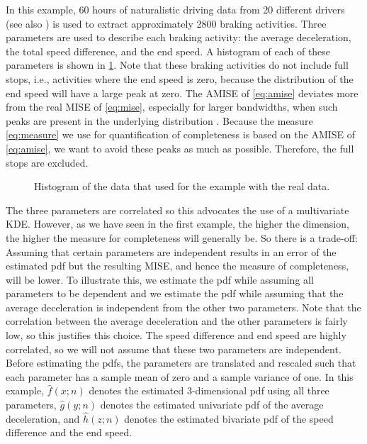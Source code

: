 In this example, 60 hours of naturalistic driving data from 20 different drivers (see also \textcite{deGelder2017assessment}) is used to extract approximately 2800 braking activities. Three parameters are used to describe each braking activity: the average deceleration, the total speed difference, and the end speed. A histogram of each of these parameters is shown in \cref{fig:histogram}. Note that these braking activities do not include full stops, i.e., activities where the end speed is zero, because the distribution of the end speed will have a large peak at zero. The AMISE of \cref{eq:amise} deviates more from the real MISE of \cref{eq:mise}, especially for larger bandwidths, when such peaks are present in the underlying distribution \cite{marron1992exact}. Because the measure \cref{eq:measure} we use for quantification of completeness is based on the AMISE of \cref{eq:amise}, we want to avoid these peaks as much as possible. Therefore, the full stops are excluded.

\setlength\figurewidth{\linewidth}
\setlength{}
\begin{figure}
	\centering
	
	\caption{Histogram of the data that used for the example with the real data.}
	\label{fig:histogram}
\end{figure}

The three parameters are correlated so this advocates the use of a multivariate KDE. However, as we have seen in the first example, the higher the dimension, the higher the measure for completeness will generally be. So there is a trade-off: Assuming that certain parameters are independent results in an error of the estimated pdf but the resulting MISE, and hence the measure of completeness, will be lower. To illustrate this, we estimate the pdf while assuming all parameters to be dependent and we estimate the pdf while assuming that the average deceleration is independent from the other two parameters. Note that the correlation between the average deceleration and the other parameters is fairly low, so this justifies this choice. The speed difference and end speed are highly correlated, so we will not assume that these two parameters are independent. Before estimating the pdfs, the parameters are translated and rescaled such that each parameter has a sample mean of zero and a sample variance of one. In this example, $\hat{f}(x;n)$ denotes the estimated 3-dimensional pdf using all three parameters, $\hat{g}(y;n)$ denotes the estimated univariate pdf of the average deceleration, and $\hat{h}(z;n)$ denotes the estimated bivariate pdf of the speed difference and the end speed.

